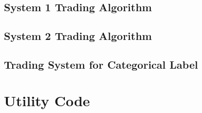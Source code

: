 \subsection{System 1 Trading Algorithm}
\label{appA:ts_1}


\subsection{System 2 Trading Algorithm}
\label{appA:ts_2}


\subsection{Trading System for Categorical Label}
\label{appA:ts_4}


%
%
%

\section{Utility Code}
\label{appA:utility}

